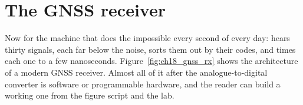 \section{The GNSS receiver}
\label{sec:ch18:receiver}

Now for the machine that does the impossible every second of every day: hears thirty signals,
each far below the noise, sorts them out by their codes, and times each one to a few nanoseconds.
Figure~\ref{fig:ch18_gnss_rx} shows the architecture of a modern GNSS receiver. Almost all of
it after the analogue-to-digital converter is software or programmable hardware, and the
reader can build a working one from the figure script and the lab.

